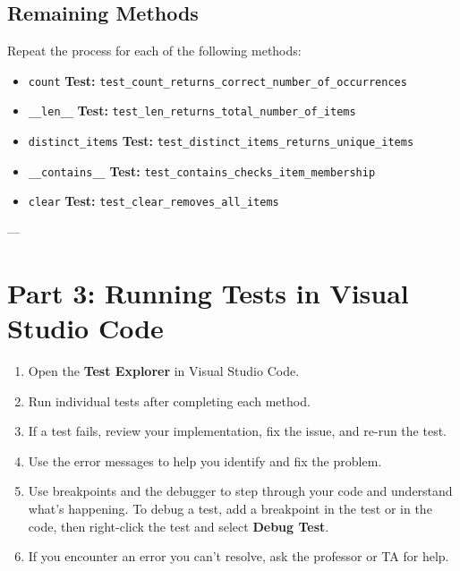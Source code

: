 \documentclass[12pt]{article}
\begin{document}
\subsection*{Remaining Methods}
Repeat the process for each of the following methods:
\begin{itemize}
    \item \texttt{count} \hspace{1cm} \textbf{Test:} \texttt{test\_count\_returns\_correct\_number\_of\_occurrences}
    \item \texttt{\_\_len\_\_} \hspace{1cm} \textbf{Test:} \texttt{test\_len\_returns\_total\_number\_of\_items}
    \item \texttt{distinct\_items} \hspace{1cm} \textbf{Test:} \texttt{test\_distinct\_items\_returns\_unique\_items}
    \item \texttt{\_\_contains\_\_} \hspace{1cm} \textbf{Test:} \texttt{test\_contains\_checks\_item\_membership}
    \item \texttt{clear} \hspace{1cm} \textbf{Test:} \texttt{test\_clear\_removes\_all\_items}
\end{itemize}

---

\section*{Part 3: Running Tests in Visual Studio Code}

\begin{enumerate}
    \item Open the \textbf{Test Explorer} in Visual Studio Code.
    \item Run individual tests after completing each method.
    \item If a test fails, review your implementation, fix the issue, and re-run the test.
    \item Use the error messages to help you identify and fix the problem. 
    \item Use breakpoints and the debugger to step through your code and understand what's happening. To debug a test, add a breakpoint in the test or in the code, then right-click the test and select \textbf{Debug Test}.
    \item If you encounter an error you can't resolve, ask the professor or TA for help.
\end{enumerate}
\end{document}
